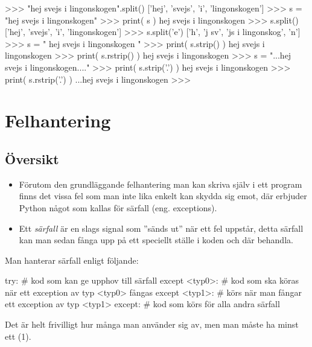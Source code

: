 \documentclass{beamer}
\begin{document}
\begin{frame}{\insertsubsectionhead}
  \begin{terminal}
>>> "hej svejs i lingonskogen".split()
['hej', 'svejs', 'i', 'lingonskogen']
>>> s = "hej svejs i lingonskogen"
>>> print( s )
hej svejs i lingonskogen
>>> s.split()
['hej', 'svejs', 'i', 'lingonskogen']
>>> s.split('e')
['h', 'j sv', 'js i lingonskog', 'n']
>>> s = "   hej svejs i lingonskogen    "
>>> print( s.strip() )
hej svejs i lingonskogen
>>> print( s.rstrip() )
   hej svejs i lingonskogen
>>> s = "...hej svejs i lingonskogen...."
>>> print( s.strip('.') )
hej svejs i lingonskogen
>>> print( s.rstrip('.') )
...hej svejs i lingonskogen
>>>
  \end{terminal}
\end{frame}


\section{Felhantering}

\subsection{Översikt}

\begin{frame}{\insertsubsectionhead}
  \begin{itemize}
    \item Förutom den grundläggande felhantering man kan skriva själv i ett 
      program finns det vissa fel som man inte lika enkelt kan skydda sig emot, 
      där erbjuder Python något som kallas för särfall (eng. exceptions).

    \item Ett \emph{särfall} är en slags signal som ''sänds ut'' när ett fel 
      uppstår, detta särfall kan man sedan fånga upp på ett speciellt ställe 
      i koden och där behandla.

  \end{itemize}
\end{frame}

\begin{frame}[fragile]{\insertsubsectionhead}
  Man hanterar särfall enligt följande:

  \begin{src}[language=python]
try:
   # kod som kan ge upphov till särfall
except <typ0>:
   # kod som ska köras när ett exception av typ <typ0> fångas
except <typ1>:
   # körs när man fångar ett exception av typ <typ1>
except:
   # kod som körs för alla andra särfall
  \end{src}

  Det är helt frivilligt hur många  man använder sig av, men man 
  måste ha minst ett (1).
\end{frame}
\end{document}

